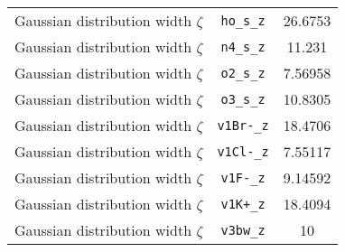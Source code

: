 \begin{table}[ht]
\begin{tabular}{lcc}
Gaussian distribution width $\zeta$ & \verb^ho_s_z^ & 26.6753 \\ 
Gaussian distribution width $\zeta$ & \verb^n4_s_z^ & 11.231 \\ 
Gaussian distribution width $\zeta$ & \verb^o2_s_z^ & 7.56958 \\ 
Gaussian distribution width $\zeta$ & \verb^o3_s_z^ & 10.8305 \\ 
Gaussian distribution width $\zeta$ & \verb^v1Br-_z^ & 18.4706 \\ 
Gaussian distribution width $\zeta$ & \verb^v1Cl-_z^ & 7.55117 \\ 
Gaussian distribution width $\zeta$ & \verb^v1F-_z^ & 9.14592 \\ 
Gaussian distribution width $\zeta$ & \verb^v1K+_z^ & 18.4094 \\ 
Gaussian distribution width $\zeta$ & \verb^v3bw_z^ & 10 \\ 
\hline
\end{tabular}
\end{table}
